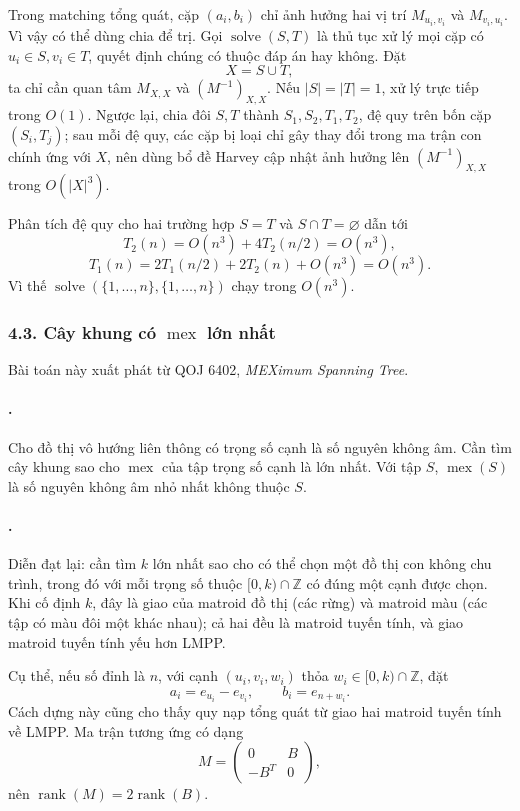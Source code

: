 \documentclass[11pt]{article}
\begin{document}
Trong matching tổng quát, cặp \((a_i,b_i)\) chỉ ảnh hưởng hai vị trí
\(M_{u_i,v_i}\) và \(M_{v_i,u_i}\). Vì vậy có thể dùng chia để trị. Gọi
\(\operatorname{solve}(S,T)\) là thủ tục xử lý mọi cặp có
\(u_i\in S, v_i\in T\), quyết định chúng có thuộc đáp án hay không. Đặt
\[
  X=S\cup T,
\]
ta chỉ cần quan tâm \(M_{X,X}\) và \((M^{-1})_{X,X}\). Nếu
\(|S|=|T|=1\), xử lý trực tiếp trong \(O(1)\). Ngược lại, chia đôi \(S,T\) thành
\(S_1,S_2,T_1,T_2\), đệ quy trên bốn cặp \((S_i,T_j)\); sau mỗi đệ quy, các cặp
bị loại chỉ gây thay đổi trong ma trận con chính ứng với \(X\), nên dùng bổ đề
Harvey cập nhật ảnh hưởng lên \((M^{-1})_{X,X}\) trong \(O(|X|^3)\).

Phân tích đệ quy cho hai trường hợp \(S=T\) và \(S\cap T=\varnothing\) dẫn tới
\[
  T_2(n)=O(n^3)+4T_2(n/2)=O(n^3),
\]
\[
  T_1(n)=2T_1(n/2)+2T_2(n)+O(n^3)=O(n^3).
\]
Vì thế \(\operatorname{solve}(\{1,\ldots,n\},\{1,\ldots,n\})\) chạy trong
\(O(n^3)\).

\subsubsection*{4.3. Cây khung có \(\operatorname{mex}\) lớn nhất}

Bài toán này xuất phát từ QOJ 6402, \emph{MEXimum Spanning Tree}.

\paragraph{.}
Cho đồ thị vô hướng liên thông có trọng số cạnh là số nguyên không âm. Cần tìm
cây khung sao cho \(\operatorname{mex}\) của tập trọng số cạnh là lớn nhất. Với
tập \(S\), \(\operatorname{mex}(S)\) là số nguyên không âm nhỏ nhất không thuộc
\(S\).

\paragraph{.}
Diễn đạt lại: cần tìm \(k\) lớn nhất sao cho có thể chọn một đồ thị con không
chu trình, trong đó với mỗi trọng số thuộc \([0,k)\cap\mathbb Z\) có đúng một
cạnh được chọn. Khi cố định \(k\), đây là giao của matroid đồ thị (các rừng) và
matroid màu (các tập có màu đôi một khác nhau); cả hai đều là matroid tuyến
tính, và giao matroid tuyến tính yếu hơn LMPP.

Cụ thể, nếu số đỉnh là \(n\), với cạnh \((u_i,v_i,w_i)\) thỏa
\(w_i\in[0,k)\cap\mathbb Z\), đặt
\[
  a_i=e_{u_i}-e_{v_i},\qquad b_i=e_{n+w_i}.
\]
Cách dựng này cũng cho thấy quy nạp tổng quát từ giao hai matroid tuyến tính về
LMPP. Ma trận tương ứng có dạng
\[
  M=
  \begin{pmatrix}
    0&B\\
    -B^T&0
  \end{pmatrix},
\]
nên \(\operatorname{rank}(M)=2\operatorname{rank}(B)\).
\end{document}
